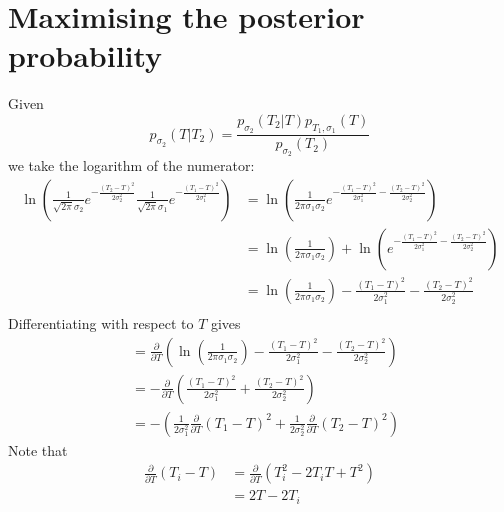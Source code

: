 \section{Maximising the posterior probability}
\label{sec:kalnay_working:max}

Given
\begin{equation}
    p_{\sigma_2} \left( T | T_2 \right) = 
    \frac{p_{\sigma_2} \left( T_2 | T \right) p_{T_1, \sigma_1} \left( T \right)}{p_{\sigma_2} \left( T_2 \right)}
\end{equation}
we take the logarithm of the numerator:
\begin{align*}
    \ln{\left( \frac{1}{\sqrt{2\pi} \sigma_2} e^{-\frac{\left( T_2 -T \right)^2}{2\sigma_2^2}} 
    \frac{1}{\sqrt{2\pi} \sigma_1} e^{-\frac{\left( T_1 -T \right)^2}{2\sigma_1^2}}\right)}
    &=
    \ln{\left( \frac{1}{2\pi \sigma_1 \sigma_2} e^{-\frac{\left( T_1 -T \right)^2}{2\sigma_1^2} -\frac{\left( T_2 -T \right)^2}{2\sigma_2^2}}\right)} \\
    &=
    \ln{\left( \frac{1}{2\pi \sigma_1 \sigma_2} \right)}
    +
    \ln{\left( e^{-\frac{\left( T_1 -T \right)^2}{2\sigma_1^2} -\frac{\left( T_2 -T \right)^2}{2\sigma_2^2}} \right)} \\
    &=
    \ln{\left( \frac{1}{2\pi \sigma_1 \sigma_2} \right)}
    -
    \frac{\left( T_1 -T \right)^2}{2\sigma_1^2}
    -
    \frac{\left( T_2 -T \right)^2}{2\sigma_2^2} \\
\end{align*}
Differentiating with respect to $T$ gives
\begin{align*}
    &= \frac{\partial}{\partial T}
    \left(
    \ln{\left( \frac{1}{2\pi \sigma_1 \sigma_2} \right)}
    -
    \frac{\left( T_1 -T \right)^2}{2\sigma_1^2}
    -
    \frac{\left( T_2 -T \right)^2}{2\sigma_2^2}
    \right) \\
    &=
    - \frac{\partial}{\partial T}
    \left(
    \frac{\left( T_1 -T \right)^2}{2\sigma_1^2}
    +
    \frac{\left( T_2 -T \right)^2}{2\sigma_2^2}
    \right) \\
    &=
    - \left(
    \frac{1}{2\sigma_1^2} \frac{\partial}{\partial T} \left( T_1 - T \right)^2
    +
    \frac{1}{2\sigma_2^2} \frac{\partial}{\partial T} \left( T_2 - T \right)^2
    \right)
\end{align*}
Note that
\begin{align*}
    \frac{\partial}{\partial T} \left( T_i - T \right)
    &=
    \frac{\partial}{\partial T} \left( T_i^2 -2 T_i T + T^2 \right) \\
    &=
    2T - 2T_i
\end{align*}
